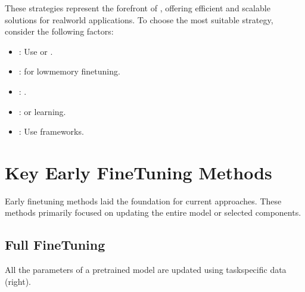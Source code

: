 \documentclass[letterpaper,11pt,english]{sphinxmanual}
\begin{document}
\sphinxAtStartPar
These strategies represent the forefront of , offering efficient and scalable solutions for
real\sphinxhyphen{}world applications. To choose the most suitable strategy, consider the following factors:
\begin{itemize}
\item {} 
\sphinxAtStartPar
{}: Use  or .

\item {} 
\sphinxAtStartPar
{}:  for low\sphinxhyphen{}memory fine\sphinxhyphen{}tuning.

\item {} 
\sphinxAtStartPar
{}: .

\item {} 
\sphinxAtStartPar
{}:  or  learning.

\item {} 
\sphinxAtStartPar
{}: Use  frameworks.

\end{itemize}


\section{Key Early Fine\sphinxhyphen{}Tuning Methods}
\label{\detokenize{finetuning:key-early-fine-tuning-methods}}
\sphinxAtStartPar
Early fine\sphinxhyphen{}tuning methods laid the foundation for current approaches. These methods
primarily focused on updating the entire model or selected components.


\subsection{Full Fine\sphinxhyphen{}Tuning}
\label{\detokenize{finetuning:full-fine-tuning}}
\sphinxAtStartPar
All the parameters of a pre\sphinxhyphen{}trained model are updated using task\sphinxhyphen{}specific data {\hyperref[\detokenize{finetuning:fig-fine-tuning}]{}} (right).
\end{document}
